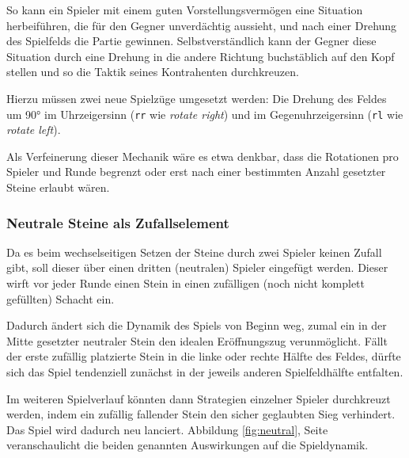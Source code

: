 \documentclass[a4paper,11pt,hidelinks]{scrartcl}
\newcommand{\imgref}[1]{{Abbildung \ref{#1}, Seite \pageref{#1}}}
\begin{document}
So kann ein Spieler mit einem guten Vorstellungsvermögen eine Situation herbeiführen, die für den Gegner unverdächtig aussieht, und nach einer Drehung des Spielfelds die Partie gewinnen. Selbstverständlich kann der Gegner diese Situation durch eine Drehung in die andere Richtung buchstäblich auf den Kopf stellen und so die Taktik seines Kontrahenten durchkreuzen.

Hierzu müssen zwei neue Spielzüge umgesetzt werden: Die Drehung des Feldes um 90° im Uhrzeigersinn (\texttt{rr} wie \textit{rotate right}) und im Gegenuhrzeigersinn (\texttt{rl} wie \textit{rotate left}).

Als Verfeinerung dieser Mechanik wäre es etwa denkbar, dass die Rotationen pro Spieler und Runde begrenzt oder erst nach einer bestimmten Anzahl gesetzter Steine erlaubt wären.

\subsubsection{Neutrale Steine als Zufallselement}

Da es beim wechselseitigen Setzen der Steine durch zwei Spieler keinen Zufall gibt, soll dieser über einen dritten (neutralen) Spieler eingefügt werden. Dieser wirft vor jeder Runde einen Stein in einen zufälligen (noch nicht komplett gefüllten) Schacht ein.

Dadurch ändert sich die Dynamik des Spiels von Beginn weg, zumal ein in der Mitte gesetzter neutraler Stein den idealen Eröffnungszug verunmöglicht. Fällt der erste zufällig platzierte Stein in die linke oder rechte Hälfte des Feldes, dürfte sich das Spiel tendenziell zunächst in der jeweils anderen Spielfeldhälfte entfalten.

Im weiteren Spielverlauf könnten dann Strategien einzelner Spieler durchkreuzt werden, indem ein zufällig fallender Stein den sicher geglaubten Sieg verhindert. Das Spiel wird dadurch neu lanciert. \imgref{fig:neutral} veranschaulicht die beiden genannten Auswirkungen auf die Spieldynamik.
\end{document}
